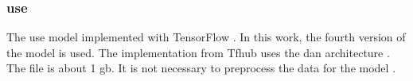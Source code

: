 \subsubsection*{\ac{use}}\label{subsubsec:impl-use}

The \ac{use} model implemented with TensorFlow \cite{HfsentTrans2019}.
In this work, the fourth version of the model is used.
The implementation from Tfhub uses the \ac{dan} architecture \cite{UniversalSentEnc-dev}.
The file is about 1 \ac{gb}. %
It is not necessary to preprocess the data for the model \cite{UniversalSentEnc-dev}.